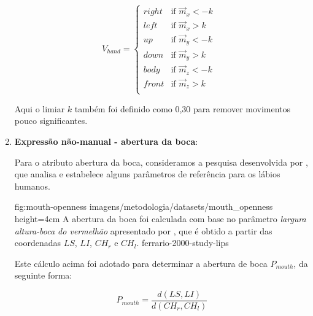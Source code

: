 \begin{enumerate}
    \begin{equation}
    \label{eqn:hand-movement-directions}
        V_{hand} =
            \begin{cases}
                right & \text{if $\overrightarrow{m}_x < {-k}$ }\\
                left  & \text{if $\overrightarrow{m}_x > {k}$ }\\
                up    & \text{if $\overrightarrow{m}_y < {-k}$ }\\
                down  & \text{if $\overrightarrow{m}_y > {k}$ }\\
                body  & \text{if $\overrightarrow{m}_z < {-k}$ }\\
                front & \text{if $\overrightarrow{m}_z > {k}$ }\\
            \end{cases}    
    \end{equation}

    Aqui o limiar \(k\) também foi definido como 0,30 para remover movimentos pouco significantes.


    \item \textbf{Expressão não-manual - abertura da boca}:
    
    Para o atributo abertura da boca, consideramos a pesquisa desenvolvida por \cite{ferrario-2000-study-lips}, que analisa e estabelece alguns parâmetros de referência para os lábios humanos.


    \figura
        {fig:mouth-openness} %
        {imagens/metodologia/datasets/mouth_openness} %
        {height=4cm} %
        {A abertura da boca foi calculada com base no parâmetro \textit{largura altura-boca do vermelhão} apresentado por \cite{ferrario-2000-study-lips}, que é obtido a partir das coordenadas \(LS\), \(LI\), \(CH_r\) e \(CH_l\).} %
        {ferrario-2000-study-lips} %

    Este cálculo acima foi adotado para determinar a abertura de boca \(P_{mouth}\), da seguinte forma:

    \begin{equation}
        \label{eqn:mouth-openness}
        P_{mouth} = \frac{d(LS, LI)}{d(CH_r, CH_l)}
    \end{equation}

\end{enumerate}